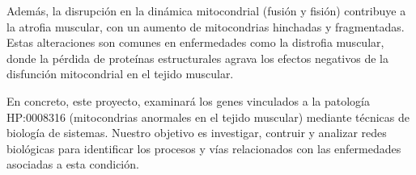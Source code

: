 Además, la disrupción en la dinámica mitocondrial (fusión y fisión) contribuye a la atrofia muscular, con un aumento de mitocondrias hinchadas y fragmentadas. Estas alteraciones son comunes en enfermedades como la distrofia muscular, donde la pérdida de proteínas estructurales agrava los efectos negativos de la disfunción mitocondrial en el tejido muscular.

En concreto, este proyecto, examinará los genes vinculados a la patología HP:0008316 (mitocondrias anormales en el tejido muscular) mediante técnicas de biología de sistemas. Nuestro objetivo es investigar, contruir y analizar redes biológicas para identificar los procesos y vías relacionados con las enfermedades asociadas a esta condición.

